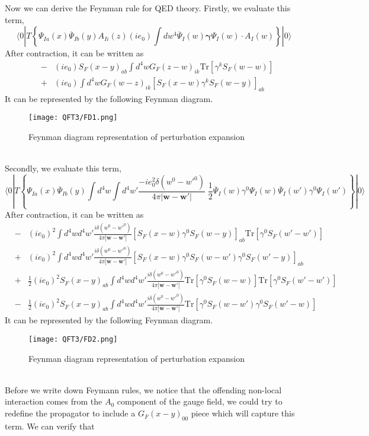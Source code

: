 \documentclass[cyan]{elegantnote}
\begin{document}
\noindent
Now we can derive the Feynman rule for QED theory.
Firstly, we evaluate this term,
\[\langle 0 | T \left\{ \Psi_{Ia}(x) \overline{\Psi}_{Ib}(y) A_{Ii}(z) (i e_0) \int dw^4 \overline{\Psi}_I(w) \bm{\gamma} \Psi_I(w) \cdot A_I(w) \right\} | 0 \rangle\]
After contraction, it can be written as
\begin{eqnarray}
&-&  (ie_0) S_F(x-y)_{ab} \int d^4 w G_F(z-w)_{ik} \mathrm{Tr}[\gamma^k S_F(w-w)] \nonumber \\
&+&  (ie_0) \int d^4 w G_F(w-z)_{ik}  [S_F(x-w) \gamma^k S_F(w-y)]_{ab}  \nonumber
\end{eqnarray}
It can be represented by the following Feynman diagram.
\begin{figure}[!h]
\centering
\texttt{[image: QFT3/FD1.png]}
\caption{Feynman diagram representation of perturbation expansion}
\end{figure}\\
Secondly, we evaluate this term,
\[\langle 0 | T \left\{ \Psi_{Ia}(x) \overline{\Psi}_{Ib}(y) \int d^4w \int d^4w' \frac{-ie_0^2\delta(w^0-w'^0)}{4\pi|\bm{w}-\bm{w}'|}\; \frac{1}{2} \overline{\Psi}_I(w)\gamma^0 \Psi_I(w) \overline{\Psi}_I(w')\gamma^0 \Psi_I(w') \right\} | 0 \rangle\]
After contraction, it can be written as
\begin{eqnarray}
&-&  (ie_0)^2 \int d^4w d^4w' \frac{i\delta(w^0-w'^0)}{4\pi|\bm{w}-\bm{w}'|} [S_F(x-w)\gamma^0 S_F(w-y)]_{ab} \mathrm{Tr}[\gamma^0 S_F(w'-w')] \nonumber \\
&+&  (ie_0)^2 \int d^4w d^4w' \frac{i\delta(w^0-w'^0)}{4\pi|\bm{w}-\bm{w}'|} [S_F(x-w)\gamma^0 S_F(w-w') \gamma^0 S_F(w'-y)]_{ab} \nonumber \\
&+& \frac{1}{2} (ie_0)^2 S_F(x-y)_{ab} \int d^4w d^4w' \frac{i\delta(w^0-w'^0)}{4\pi|\bm{w}-\bm{w}'|} \mathrm{Tr}[\gamma^0 S_F(w-w)] \mathrm{Tr}[\gamma^0 S_F(w'-w')] \nonumber \\
&-& \frac{1}{2} (ie_0)^2 S_F(x-y)_{ab} \int d^4w d^4w' \frac{i\delta(w^0-w'^0)}{4\pi|\bm{w}-\bm{w}'|} \mathrm{Tr}[\gamma^0 S_F(w-w')\gamma^0 S_F(w'-w)] \nonumber
\end{eqnarray}
It can be represented by the following Feynman diagram.
\begin{figure}[!h]
\centering
\texttt{[image: QFT3/FD2.png]}
\caption{Feynman diagram representation of perturbation expansion}
\end{figure}\\
Before we write down Feymann rules, we notice that the offending non-local interaction comes from the $A_0$ component of the gauge field, we could try to redefine the propagator to include a $G_F(x-y)_{00}$ piece which will capture this term. We can verify that
\end{document}
